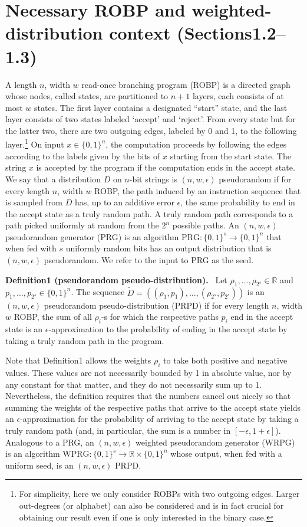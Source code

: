 \documentclass[10pt,a4paper]{article}
\newenvironment{authorclaim}[1]{\par\medskip\noindent\textbf{#1.}\ }{\par\medskip}
\begin{document}
\section*{Necessary ROBP and weighted-distribution context (Sections1.2--1.3)}
A length $n$, width $w$ read-once branching program (ROBP) is a directed graph whose nodes, called states, are partitioned to $n+1$ layers, each consists of at most $w$ states. The first layer contains a designated ``start'' state, and the last layer consists of two states labeled `accept' and `reject'. From every state but for the latter two, there are two outgoing edges, labeled by 0 and 1, to the following layer.\footnote{For simplicity, here we only consider ROBPs with two outgoing edges. Larger out-degrees (or alphabet) can also be considered and is in fact crucial for obtaining our result even if one is only interested in the binary case.} On input $x\in\{0,1\}^n$, the computation proceeds by following the edges according to the labels given by the bits of $x$ starting from the start state. The string $x$ is accepted by the program if the computation ends in the accept state.
We say that a distribution $D$ on $n$-bit strings is $(n,w,\epsilon)$ pseudorandom if for every length $n$, width $w$ ROBP, the path induced by an instruction sequence that is sampled from $D$ has, up to an additive error $\epsilon$, the same probability to end in the accept state as a truly random path. A truly random path corresponds to a path picked uniformly at random from the $2^n$ possible paths. An $(n,w,\epsilon)$ pseudorandom generator (PRG) is an algorithm $\mathrm{PRG}:\{0,1\}^s\to\{0,1\}^n$ that when fed with $s$ uniformly random bits has an output distribution that is $(n,w,\epsilon)$ pseudorandom. We refer to the input to PRG as the seed.
\begin{authorclaim}{Definition1 (pseudorandom pseudo-distribution)}
Let $\rho_1,\ldots,\rho_{2^s}\in\mathbb R$ and $p_1,\ldots,p_{2^s}\in\{0,1\}^n$. The sequence $\widetilde D=((\rho_1,p_1),\ldots,(\rho_{2^s},p_{2^s}))$ is an $(n,w,\epsilon)$ pseudorandom pseudo-distribution (PRPD) if for every length $n$, width $w$ ROBP, the sum of all $\rho_i$-s for which the respective paths $p_i$ end in the accept state is an $\epsilon$-approximation to the probability of ending in the accept state by taking a truly random path in the program.
\end{authorclaim}
Note that Definition1 allows the weights $\rho_i$ to take both positive and negative values. These values are not necessarily bounded by 1 in absolute value, nor by any constant for that matter, and they do not necessarily sum up to 1. Nevertheless, the definition requires that the numbers cancel out nicely so that summing the weights of the respective paths that arrive to the accept state yields an $\epsilon$-approximation for the probability of arriving to the accept state by taking a truly random path (and, in particular, the sum is a number in $[-\epsilon,1+\epsilon]$). Analogous to a PRG, an $(n,w,\epsilon)$ weighted pseudorandom generator (WRPG) is an algorithm $\mathrm{WPRG}:\{0,1\}^s\to\mathbb R\times\{0,1\}^n$ whose output, when fed with a uniform seed, is an $(n,w,\epsilon)$ PRPD.
\end{document}
